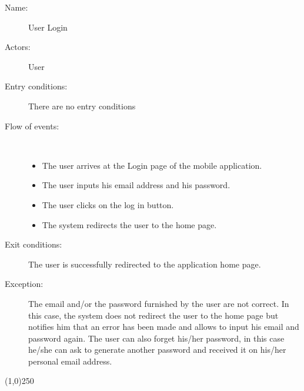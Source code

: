 \begin{description}
	\item[Name:] User Login
	\item[Actors:] User
	\item[Entry conditions:] There are no entry conditions
	\item[Flow of events:]  \ \\
		\begin{itemize}
			\item The user arrives at the Login page of the mobile application.
			\item The user inputs his email address and his password.
			\item The user clicks on the log in button.
			\item The system redirects the user to the home page.
		\end{itemize}
	\item[Exit conditions:] The user is successfully redirected to the application home page.
	\item [Exception:] The email and/or the password furnished by the user are not correct. In this case, the system does not redirect the user to the home page but notifies him that an error has been made and allows to input his email and password again. The user can also forget his/her password, in this case he/she can ask to generate another password and received it on his/her personal email address.
\end{description}

\begin{center}
\line(1,0){250}
\end{center}

